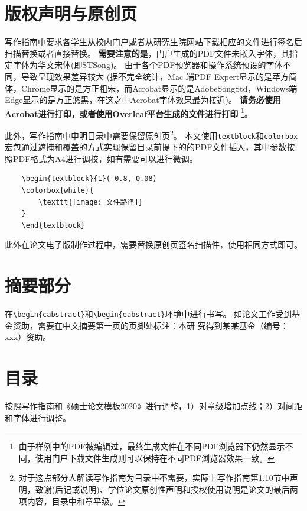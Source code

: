 \section{版权声明与原创页}
\label{sec:copy-origin}

写作指南中要求各学生从校内门户或者从研究生院网站下载相应的文件进行签名后扫描替换或者直接替换。
\textbf{需要注意的是}，门户生成的PDF文件未嵌入字体，其指定字体为华文宋体(即STSong)。
由于各个PDF预览器和操作系统预设的字体不同，导致呈现效果差异较大
(据不完全统计，Mac 端PDF Expert显示的是苹方简体，Chrome显示的是方正粗宋，而Acrobat显示的是AdobeSongStd，Windows端Edge显示的是方正悠黑，在这之中Acrobat字体效果最为接近)。
\textbf{请务必使用Acrobat进行打印，或者使用Overleaf平台生成的文件进行打印}
\footnote{由于样例中的PDF被编辑过，最终生成文件在不同PDF浏览器下仍然显示不同，使用门户下载文件生成则可以保持在不同PDF浏览器效果一致。}。

此外，写作指南中申明目录中需要保留原创页\footnote{对于这点部分人解读写作指南为目录中不需要，实际上写作指南第1.10节中声明，致谢(后记或说明)、学位论文原创性声明和授权使用说明是论文的最后两项内容，目录中和章平级。}。
本文使用\verb|textblock|和\verb|colorbox|宏包通过遮掩和覆盖的方式实现保留目录前提下的的PDF文件插入，其中参数按照PDF格式为A4进行调校，如有需要可以进行微调。

\begin{Verbatim}
    \begin{textblock}{1}(-0.8,-0.08)
    \colorbox{white}{
        \texttt{[image: 文件路径]}
    }
    \end{textblock}
\end{Verbatim}

此外在论文电子版制作过程中，需要替换原创页签名扫描件，使用相同方式即可。

\section{摘要部分}
\label{sec:abstract}

在\verb|\begin{cabstract}|和\verb|\begin{eabstract}|环境中进行书写。
如论文工作受到基金资助，需要在中文摘要第一页的页脚处标注：本研 究得到某某基金（编号：xxx）资助。

\section{目录}
\label{sec:directory}

按照写作指南和《硕士论文模板2020》进行调整，1）对章级增加点线；2）对间距和字体进行调整。

